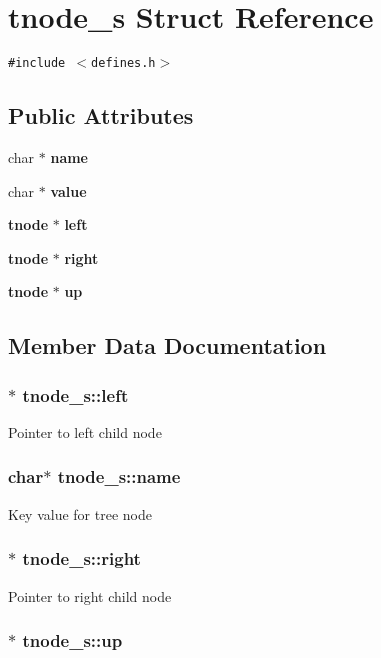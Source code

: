 \section{tnode\_\-s Struct Reference}
\label{structtnode__s}
{\tt \#include $<$defines.h$>$}

\subsection*{Public Attributes}
\begin{CompactItemize}
\item 
char $\ast$ {\bf name}
\item 
char $\ast$ {\bf value}
\item 
{\bf tnode} $\ast$ {\bf left}
\item 
{\bf tnode} $\ast$ {\bf right}
\item 
{\bf tnode} $\ast$ {\bf up}
\end{CompactItemize}


\subsection{Member Data Documentation}
\subsubsection{$\ast$ tnode\_\-s::left}\label{structtnode__s_m2}


Pointer to left child node 
\subsubsection{\setlength{\rightskip}{0pt plus 5cm}char$\ast$ tnode\_\-s::name}\label{structtnode__s_m0}


Key value for tree node 
\subsubsection{$\ast$ tnode\_\-s::right}\label{structtnode__s_m3}


Pointer to right child node 
\subsubsection{$\ast$ tnode\_\-s::up}\label{structtnode__s_m4}


